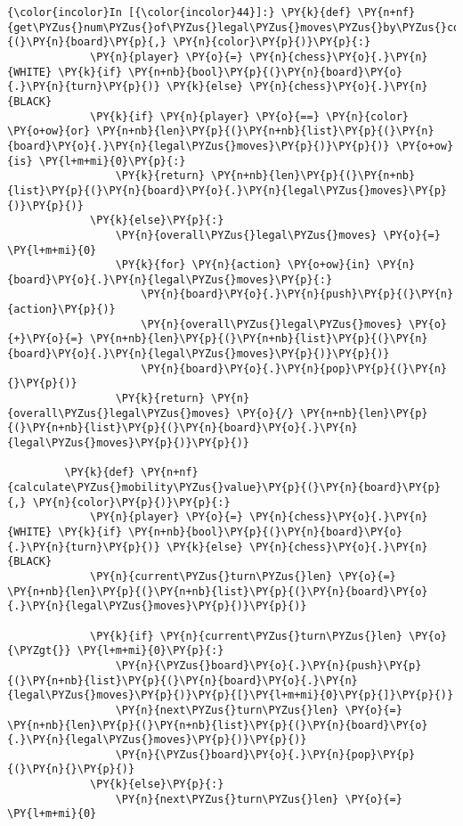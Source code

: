     \begin{Verbatim}[commandchars=\\\{\}]
{\color{incolor}In [{\color{incolor}44}]:} \PY{k}{def} \PY{n+nf}{get\PYZus{}num\PYZus{}of\PYZus{}legal\PYZus{}moves\PYZus{}by\PYZus{}color}\PY{p}{(}\PY{n}{board}\PY{p}{,} \PY{n}{color}\PY{p}{)}\PY{p}{:}
             \PY{n}{player} \PY{o}{=} \PY{n}{chess}\PY{o}{.}\PY{n}{WHITE} \PY{k}{if} \PY{n+nb}{bool}\PY{p}{(}\PY{n}{board}\PY{o}{.}\PY{n}{turn}\PY{p}{)} \PY{k}{else} \PY{n}{chess}\PY{o}{.}\PY{n}{BLACK}
             \PY{k}{if} \PY{n}{player} \PY{o}{==} \PY{n}{color} \PY{o+ow}{or} \PY{n+nb}{len}\PY{p}{(}\PY{n+nb}{list}\PY{p}{(}\PY{n}{board}\PY{o}{.}\PY{n}{legal\PYZus{}moves}\PY{p}{)}\PY{p}{)} \PY{o+ow}{is} \PY{l+m+mi}{0}\PY{p}{:}
                 \PY{k}{return} \PY{n+nb}{len}\PY{p}{(}\PY{n+nb}{list}\PY{p}{(}\PY{n}{board}\PY{o}{.}\PY{n}{legal\PYZus{}moves}\PY{p}{)}\PY{p}{)}
             \PY{k}{else}\PY{p}{:}
                 \PY{n}{overall\PYZus{}legal\PYZus{}moves} \PY{o}{=} \PY{l+m+mi}{0}
                 \PY{k}{for} \PY{n}{action} \PY{o+ow}{in} \PY{n}{board}\PY{o}{.}\PY{n}{legal\PYZus{}moves}\PY{p}{:}
                     \PY{n}{board}\PY{o}{.}\PY{n}{push}\PY{p}{(}\PY{n}{action}\PY{p}{)}
                     \PY{n}{overall\PYZus{}legal\PYZus{}moves} \PY{o}{+}\PY{o}{=} \PY{n+nb}{len}\PY{p}{(}\PY{n+nb}{list}\PY{p}{(}\PY{n}{board}\PY{o}{.}\PY{n}{legal\PYZus{}moves}\PY{p}{)}\PY{p}{)}
                     \PY{n}{board}\PY{o}{.}\PY{n}{pop}\PY{p}{(}\PY{n}{}\PY{p}{)}
                 \PY{k}{return} \PY{n}{overall\PYZus{}legal\PYZus{}moves} \PY{o}{/} \PY{n+nb}{len}\PY{p}{(}\PY{n+nb}{list}\PY{p}{(}\PY{n}{board}\PY{o}{.}\PY{n}{legal\PYZus{}moves}\PY{p}{)}\PY{p}{)}
             
         \PY{k}{def} \PY{n+nf}{calculate\PYZus{}mobility\PYZus{}value}\PY{p}{(}\PY{n}{board}\PY{p}{,} \PY{n}{color}\PY{p}{)}\PY{p}{:}
             \PY{n}{player} \PY{o}{=} \PY{n}{chess}\PY{o}{.}\PY{n}{WHITE} \PY{k}{if} \PY{n+nb}{bool}\PY{p}{(}\PY{n}{board}\PY{o}{.}\PY{n}{turn}\PY{p}{)} \PY{k}{else} \PY{n}{chess}\PY{o}{.}\PY{n}{BLACK}
             \PY{n}{current\PYZus{}turn\PYZus{}len} \PY{o}{=} \PY{n+nb}{len}\PY{p}{(}\PY{n+nb}{list}\PY{p}{(}\PY{n}{board}\PY{o}{.}\PY{n}{legal\PYZus{}moves}\PY{p}{)}\PY{p}{)}
         
             \PY{k}{if} \PY{n}{current\PYZus{}turn\PYZus{}len} \PY{o}{\PYZgt{}} \PY{l+m+mi}{0}\PY{p}{:}
                 \PY{n}{\PYZus{}board}\PY{o}{.}\PY{n}{push}\PY{p}{(}\PY{n+nb}{list}\PY{p}{(}\PY{n}{board}\PY{o}{.}\PY{n}{legal\PYZus{}moves}\PY{p}{)}\PY{p}{[}\PY{l+m+mi}{0}\PY{p}{]}\PY{p}{)}
                 \PY{n}{next\PYZus{}turn\PYZus{}len} \PY{o}{=} \PY{n+nb}{len}\PY{p}{(}\PY{n+nb}{list}\PY{p}{(}\PY{n}{board}\PY{o}{.}\PY{n}{legal\PYZus{}moves}\PY{p}{)}\PY{p}{)}
                 \PY{n}{\PYZus{}board}\PY{o}{.}\PY{n}{pop}\PY{p}{(}\PY{n}{}\PY{p}{)}
             \PY{k}{else}\PY{p}{:}
                 \PY{n}{next\PYZus{}turn\PYZus{}len} \PY{o}{=} \PY{l+m+mi}{0}
             

\end{Verbatim}
